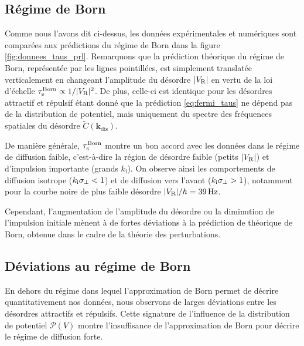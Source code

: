 \subsection{Régime de Born}
Comme nous l'avons dit ci-dessus, les données expérimentales et numériques sont comparées aux prédictions du régime de Born dans la figure \ref{fig:donnees_taus_prl}. Remarquons que la prédiction théorique du régime de Born, représentée par les lignes pointillées, est simplement translatée verticalement en changeant l'amplitude du désordre $|V_{\mathrm{R}}|$ en vertu de la loi d'échelle $\tau_{\mathrm{s}}^{\mathrm{Born}} \propto 1/|V_{\mathrm{R}}|^2$. De plus, celle-ci est identique pour les désordres attractif et répulsif étant donné que la prédiction \ref{eq:fermi_taus} ne dépend pas de la distribution de potentiel, mais uniquement du spectre des fréquences spatiales du désordre $\widetilde{C}(\mathbf{k}_{\mathrm{dis}})$. 

De manière générale, $\tau_{\mathrm{s}}^{\mathrm{Born}}$ montre un bon accord avec les données dans le régime de diffusion faible, c'est-à-dire la région de désordre faible (petits $|V_{\mathrm{R}}|$) et d'impulsion importante (grands $k_{\mathrm{i}}$). On observe ainsi les comportements de diffusion isotrope ($k_{\mathrm{i}}\sigma_{\perp}<1$) et de diffusion vers l'avant ($k_{\mathrm{i}}\sigma_{\perp}>1$), notamment pour la courbe noire de plus faible désordre $|V_{\mathrm{R}}|/h=\SI{39}{\hertz}$. 

Cependant, l'augmentation de l'amplitude du désordre ou la diminution de l'impulsion initiale mènent à de fortes déviations à la prédiction de théorique de Born, obtenue dans le cadre de la théorie des perturbations. %


\subsection{Déviations au régime de Born}
\label{sc:deviation_regime_born}
En dehors du régime dans lequel l'approximation de Born permet de décrire quantitativement nos données, nous observons de larges déviations entre les désordres attractifs et répulsifs. Cette signature de l'influence de la distribution de potentiel $\mathcal{P}(V)$ montre l'insuffisance de l'approximation de Born pour décrire le régime de diffusion forte.

